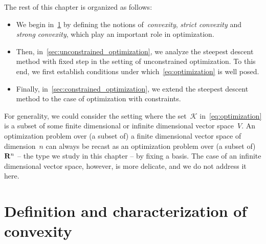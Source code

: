 The rest of this chapter is organized as follows:
\begin{itemize}
    \item
        We begin in~\cref{sec:convexity} by defining the notions of~\emph{convexity}, \emph{strict convexity} and \emph{strong convexity},
        which play an important role in optimization.

    \item
        Then, in~\cref{sec:unconstrained_optimization},
        we analyze the steepest descent method with fixed step in the setting of unconstrained optimization.
        To this end, we first establish conditions under which~\eqref{eq:optimization} is well posed.

    \item
        Finally, in~\cref{sec:constrained_optimization},
        we extend the steepest descent method to the case of optimization with constraints.
\end{itemize}

\begin{remark}
    For generality, we could consider the setting where the set~$\mathcal K$ in~\eqref{eq:optimization} is a subset of some finite dimensional or infinite dimensional vector space~$V$.
    An optimization problem over (a subset of) a finite dimensional vector space of dimension~$n$ can always be recast as an optimization problem over (a subset of) $\mathbf R^n$
    -- the type we study in this chapter -- by fixing a basis.
    The case of an infinite dimensional vector space, however,
    is more delicate, and we do not address it here.
\end{remark}

\section{Definition and characterization of convexity}
\label{sec:convexity}

